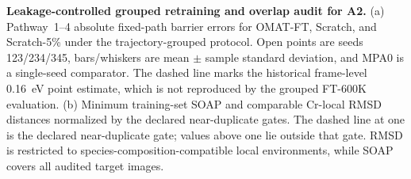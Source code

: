 \textbf{Leakage-controlled grouped retraining and overlap audit for A2.} (a) Pathway~1--4 absolute fixed-path barrier errors for OMAT-FT, Scratch, and Scratch-5\% under the trajectory-grouped protocol. Open points are seeds 123/234/345, bars/whiskers are mean $\pm$ sample standard deviation, and MPA0 is a single-seed comparator. The dashed line marks the historical frame-level 0.16~eV point estimate, which is not reproduced by the grouped FT-600K evaluation. (b) Minimum training-set SOAP and comparable Cr-local RMSD distances normalized by the declared near-duplicate gates. The dashed line at one is the declared near-duplicate gate; values above one lie outside that gate. RMSD is restricted to species-composition-compatible local environments, while SOAP covers all audited target images.
